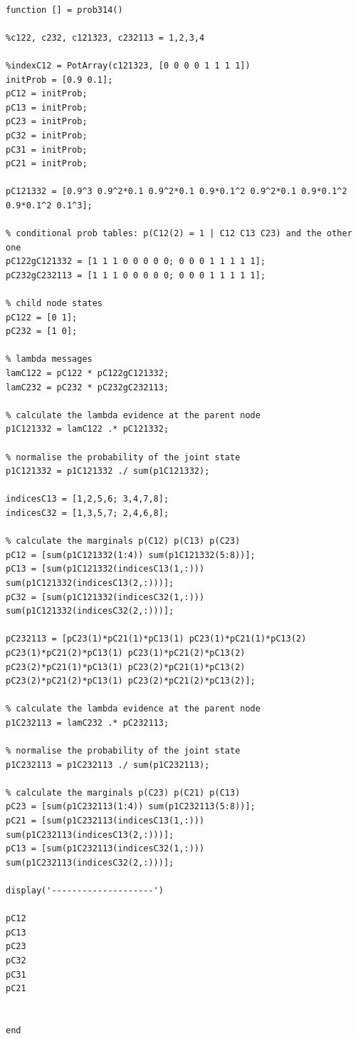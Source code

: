 \documentclass[11pt,a4paper,oneside]{report}
\begin{document}
\begin{lstlisting}

function [] = prob314()

%c122, c232, c121323, c232113 = 1,2,3,4

%indexC12 = PotArray(c121323, [0 0 0 0 1 1 1 1])
initProb = [0.9 0.1];
pC12 = initProb;
pC13 = initProb;
pC23 = initProb;
pC32 = initProb;
pC31 = initProb;
pC21 = initProb;

pC121332 = [0.9^3 0.9^2*0.1 0.9^2*0.1 0.9*0.1^2 0.9^2*0.1 0.9*0.1^2 0.9*0.1^2 0.1^3];

% conditional prob tables: p(C12(2) = 1 | C12 C13 C23) and the other one
pC122gC121332 = [1 1 1 0 0 0 0 0; 0 0 0 1 1 1 1 1];
pC232gC232113 = [1 1 1 0 0 0 0 0; 0 0 0 1 1 1 1 1];

% child node states
pC122 = [0 1];
pC232 = [1 0];

% lambda messages
lamC122 = pC122 * pC122gC121332;
lamC232 = pC232 * pC232gC232113;

% calculate the lambda evidence at the parent node
p1C121332 = lamC122 .* pC121332;

% normalise the probability of the joint state
p1C121332 = p1C121332 ./ sum(p1C121332);

indicesC13 = [1,2,5,6; 3,4,7,8];
indicesC32 = [1,3,5,7; 2,4,6,8];

% calculate the marginals p(C12) p(C13) p(C23)
pC12 = [sum(p1C121332(1:4)) sum(p1C121332(5:8))];
pC13 = [sum(p1C121332(indicesC13(1,:))) sum(p1C121332(indicesC13(2,:)))];
pC32 = [sum(p1C121332(indicesC32(1,:))) sum(p1C121332(indicesC32(2,:)))];

pC232113 = [pC23(1)*pC21(1)*pC13(1) pC23(1)*pC21(1)*pC13(2) pC23(1)*pC21(2)*pC13(1) pC23(1)*pC21(2)*pC13(2) pC23(2)*pC21(1)*pC13(1) pC23(2)*pC21(1)*pC13(2) pC23(2)*pC21(2)*pC13(1) pC23(2)*pC21(2)*pC13(2)];

% calculate the lambda evidence at the parent node
p1C232113 = lamC232 .* pC232113;

% normalise the probability of the joint state
p1C232113 = p1C232113 ./ sum(p1C232113);
     
% calculate the marginals p(C23) p(C21) p(C13)
pC23 = [sum(p1C232113(1:4)) sum(p1C232113(5:8))];
pC21 = [sum(p1C232113(indicesC13(1,:))) sum(p1C232113(indicesC13(2,:)))];
pC13 = [sum(p1C232113(indicesC32(1,:))) sum(p1C232113(indicesC32(2,:)))];

display('--------------------')

pC12
pC13
pC23
pC32
pC31
pC21

        
end
\end{lstlisting}
\end{document}
